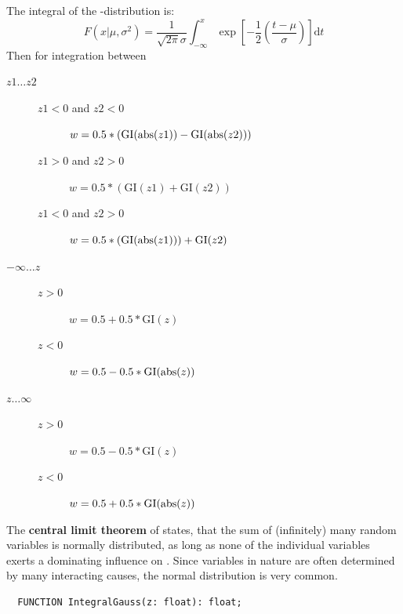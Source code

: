 \begin{refsection}
The integral of the -distribution is:
\begin{equation}
  F(x | \mu, \sigma^2) = \frac{1}{\sqrt{2\pi}\sigma} \int_{-\infty}^{x} \exp\left[ -\frac{1}{2}\left(\frac{t-\mu}{\sigma}\right) \right] \mathrm{d}t
\end{equation}
Then for integration between
\begin{description}
  \item[ \( z1\ldots z2 \)]{\hspace{10mm}
     \begin{description}
        \item[\( z1 < 0 \) and \(z2 < 0 \)]{\( w = 0.5 * (\mathrm{GI}(\operatorname{abs}(z1)) - \mathrm{GI}(\operatorname{abs}(z2))) \)}
        \item[\( z1 > 0 \) and \(z2 > 0 \)]{\( w = 0.5 * (\mathrm{GI}(z1) + \mathrm{GI}(z2)) \)}
        \item[\( z1 < 0 \) and \(z2 > 0 \)]{\( w = 0.5 * (\mathrm{GI}(\operatorname{abs}(z1))) + \mathrm{GI}(z2) \)}
     \end{description}  }
  \item[\( -\infty\ldots z \)]{\hspace{10mm}
     \begin{description}
        \item[\( z > 0 \)]{\( w = 0.5 + 0.5 * \mathrm{GI}(z) \)}
        \item[\( z < 0 \)]{\( w = 0.5 - 0.5 * \mathrm{GI}(\operatorname{abs}(z)) \)}
     \end{description} }
  \item[ \( z\ldots \infty \)]{\hspace{10mm}
     \begin{description}
        \item[\( z > 0 \)]{\( w = 0.5 - 0.5 * \mathrm{GI}(z) \)}
        \item[\( z < 0 \)]{\( w = 0.5 + 0.5 * \mathrm{GI}(\operatorname{abs}(z)) \)}
     \end{description} }
\end{description}
The \textbf{central limit theorem} of  states, that the sum of (infinitely) many random variables is normally distributed, as long as none of the individual variables exerts a dominating influence on \skalar{\sigma}. Since  variables in nature are often determined by many interacting causes, the normal distribution is very common.

\begin{lstlisting}
  FUNCTION IntegralGauss(z: float): float;


\end{lstlisting}
\end{refsection}

